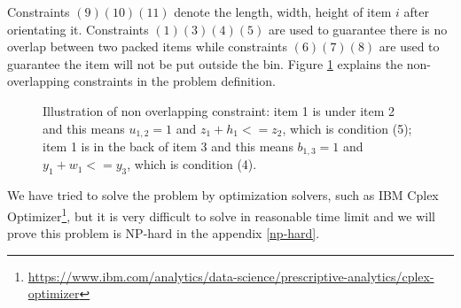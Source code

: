 Constraints $(9) (10) (11)$ denote the length, width, height of item $i$ after orientating it. Constraints $(1) (3) (4) (5)$ are used to guarantee there is no overlap between two packed items while constraints $(6) (7) (8)$ are used to guarantee the item will not be put outside the bin. Figure \ref{fig:problem-illu} explains the non-overlapping constraints in the problem definition.

\begin{figure}[h]
	\centering
	\caption{Illustration of non overlapping constraint: item 1 is under item 2 and this means $u_{1,2}=1$ and $z_1 + h_1 <= z_2$, which is condition (5); item 1 is in the back of item 3 and this means $b_{1,3}=1$ and $y_1 + w_1 <= y_3$, which is condition (4). }
	\label{fig:problem-illu}
	\vspace{-10pt}
\end{figure}



We have tried to solve the problem by optimization solvers, such as IBM Cplex Optimizer\footnote{\url{https://www.ibm.com/analytics/data-science/prescriptive-analytics/cplex-optimizer}}, but it is very difficult to solve in reasonable time limit and we will prove this problem is NP-hard in the appendix \ref{np-hard}. 


